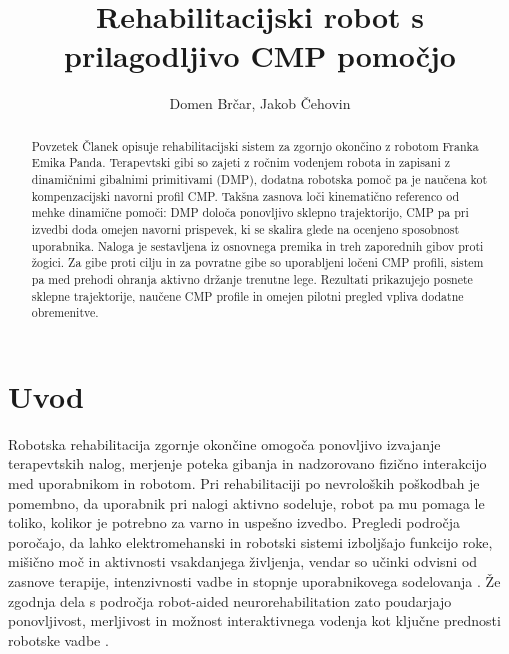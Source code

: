 \documentclass[a4paper]{article}
\begin{document}
\sloppy

\title{Rehabilitacijski robot s prilagodljivo CMP pomočjo}

\author{Domen Brčar, Jakob Čehovin}



\maketitle

\begin{abstract}{Povzetek}
Članek opisuje rehabilitacijski sistem za zgornjo okončino z robotom Franka
Emika Panda. Terapevtski gibi so zajeti z ročnim vodenjem robota in zapisani z
dinamičnimi gibalnimi primitivami (DMP), dodatna robotska pomoč pa je naučena
kot kompenzacijski navorni profil CMP. Takšna zasnova loči kinematično
referenco od mehke dinamične pomoči: DMP določa ponovljivo sklepno
trajektorijo, CMP pa pri izvedbi doda omejen navorni prispevek, ki se skalira
glede na ocenjeno sposobnost uporabnika. Naloga je sestavljena iz osnovnega
premika in treh zaporednih gibov proti žogici. Za gibe proti cilju in za
povratne gibe so uporabljeni ločeni CMP profili, sistem pa med prehodi ohranja
aktivno držanje trenutne lege. Rezultati prikazujejo posnete sklepne
trajektorije, naučene CMP profile in omejen pilotni pregled vpliva dodatne
obremenitve.
\end{abstract}

\section{Uvod}

Robotska rehabilitacija zgornje okončine omogoča ponovljivo izvajanje
terapevtskih nalog, merjenje poteka gibanja in nadzorovano fizično interakcijo
med uporabnikom in robotom. Pri rehabilitaciji po nevroloških poškodbah je
pomembno, da uporabnik pri nalogi aktivno sodeluje, robot pa mu pomaga le toliko,
kolikor je potrebno za varno in uspešno izvedbo. Pregledi področja poročajo, da
lahko elektromehanski in robotski sistemi izboljšajo funkcijo roke, mišično moč
in aktivnosti vsakdanjega življenja, vendar so učinki odvisni od zasnove
terapije, intenzivnosti vadbe in stopnje uporabnikovega sodelovanja
\cite{mehrholz2018cochrane}. Že zgodnja dela s področja robot-aided
neurorehabilitation zato poudarjajo ponovljivost, merljivost in možnost
interaktivnega vodenja kot ključne prednosti robotske vadbe
\cite{krebs1998robot}.
\end{document}
